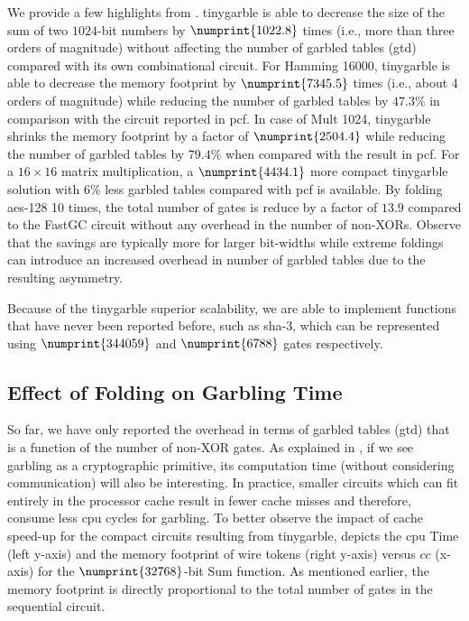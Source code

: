 We provide a few highlights from .
\gls{tinygarble} is able to decrease the size of the sum of two $1024$-bit numbers by $\numprint{1022.8}$ times (i.e., more than three orders of magnitude) without affecting the number of garbled tables (\acrshort{gtd}) compared with its own combinational circuit.
For Hamming 16000, \gls{tinygarble} is able to decrease the memory footprint by $\numprint{7345.5}$ times (i.e., about 4 orders of magnitude) while reducing the number of garbled tables by $47.3\%$ in comparison with the circuit reported in \gls{pcf}.
In case of Mult 1024, \gls{tinygarble} shrinks the memory footprint by a factor of $\numprint{2504.4}$ while reducing the number of garbled tables by $79.4\%$ when compared with the result in \gls{pcf}.
For a $16\times 16$ matrix multiplication, a $\numprint{4434.1}$ more compact \gls{tinygarble} solution with $6\%$ less garbled tables compared with \gls{pcf} is available.
By folding \acrshort{aes}-128 10 times, the total number of gates is reduce by a factor of $13.9$ compared to the  FastGC circuit without any overhead in the number of non-XORs.
Observe that the savings are typically more for larger bit-widths while extreme foldings can introduce an increased overhead in number of garbled tables due to the resulting asymmetry.

Because of the \gls{tinygarble} superior scalability, we are able to implement functions that have never been reported before, such as \acrshort{sha}-3, which can be represented using $\numprint{344059}$ and $\numprint{6788}$ gates respectively.

\subsection{Effect of Folding on Garbling Time} \label{ssec:eval-tinygarble-timing}
So far, we have only reported the overhead in terms of garbled tables (\acrshort{gtd}) that is a function of the number of non-XOR gates.
As explained in \cite{bellare2013efficient}, if we see garbling as a cryptographic primitive, its computation time (without considering communication) will also be interesting.
In practice, smaller circuits which can fit entirely in the processor cache result in fewer cache misses and therefore, consume less \acrshort{cpu} cycles for garbling.
To better observe the impact of cache speed-up for the compact circuits resulting from \gls{tinygarble},  depicts the \acrshort{cpu} Time (left y-axis) and the memory footprint of wire tokens (right y-axis) versus $cc$ (x-axis) for the $\numprint{32768}$-bit Sum function.
As mentioned earlier, the memory footprint is directly proportional to the total number of gates in the sequential circuit.

